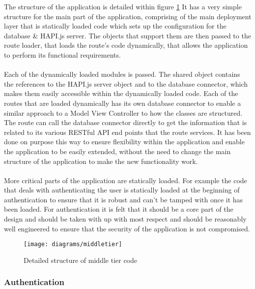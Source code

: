The structure of the application is detailed within figure \ref{fig:middle_tier_code} It has a very simple structure for the main part of the application, comprising of the main deployment layer that is statically loaded code which sets up the configuration for the database \& HAPI.js server. The objects that support them are then passed to the route loader, that loads the route's code dynamically, that allows the application to perform its functional requirements.\\
\\
Each of the dynamically loaded modules is passed. The shared object contains the references to the HAPI.js server object and to the database connector, which makes them easily accessible within the dynamically loaded code. Each of the routes that are loaded dynamically has its own database connector to enable a similar approach to a Model View Controller to how the classes are structured. The route can call the database connector directly to get the information that is related to its various RESTful API end points that the route services. It has been done on purpose this way to ensure flexibility within the application and enable the application to be easily extended, without the need to change the main structure of the application to make the new functionality work.\\
\\
More critical parts of the application are statically loaded. For example the code that deals with authenticating the user is statically loaded at the beginning of authentication to ensure that it is robust and can't be tamped with once it has been loaded. For authentication it is felt that it should be a core part of the design and should be taken with up with most respect and should be reasonably well engineered to ensure that the security of the application is not compromised.
 
\begin{figure}[H]
    \centering
    \texttt{[image: diagrams/middletier]}
    \caption{Detailed structure of middle tier code}
    \label{fig:middle_tier_code}
\end{figure} 

\subsubsection{Authentication}

